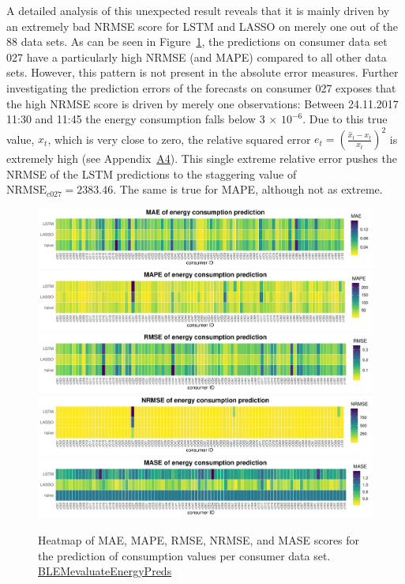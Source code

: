 A detailed analysis of this unexpected result reveals that it is mainly driven by an extremely bad NRMSE score for LSTM and LASSO on merely one out of the 88 data sets. As can be seen in Figure~\ref{Fig:heatmaps}, the predictions on consumer data set 027 have a particularly high NRMSE (and MAPE) compared to all other data sets. However, this pattern is not present in the absolute error measures. Further investigating the prediction errors of the forecasts on consumer 027 exposes that the high NRMSE score is driven by merely one observations: Between 24.11.2017 11:30 and 11:45 the energy consumption falls below 3 $\times$ $10^{-6}$. Due to this true value, $x_t$, which is very close to zero, the relative squared error $e_t = \left(\frac{\widehat{x}_t-x_t}{x_t}\right)^2$ is extremely high (see Appendix~\hyperlink{AppA4:Figures:erroranalysis}{A4}). This single extreme relative error pushes the NRMSE of the LSTM predictions to the staggering value of $\text{NRMSE}_{c027}=2383.46$. The same is true for MAPE, although not as extreme.
%
\begin{figure}[ht]
 \centering
 \includegraphics[width=\textwidth]{thesis/graphs/evaluation/c_heatmap_MAE.pdf}
 \includegraphics[width=\textwidth]{thesis/graphs/evaluation/c_heatmap_MAPE.pdf}
 \includegraphics[width=\textwidth]{thesis/graphs/evaluation/c_heatmap_RMSE.pdf}
 \includegraphics[width=\textwidth]{thesis/graphs/evaluation/c_heatmap_NRMSE.pdf}
 \includegraphics[width=\textwidth]{thesis/graphs/evaluation/c_heatmap_MASE.pdf}
\caption[Heatmaps of error measures for prediction of consumption values]{Heatmap of MAE, MAPE, RMSE, NRMSE, and MASE scores for the prediction of consumption values per consumer data set. \quantnet\href{https://github.com/QuantLet/BLEM/tree/master/BLEMevaluateEnergyPreds}{BLEMevaluateEnergyPreds}}
\label{Fig:heatmaps}
\end{figure}
%

